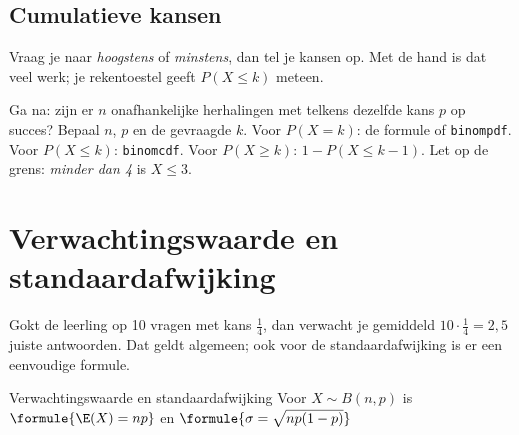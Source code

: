 \subsection{Cumulatieve kansen}

Vraag je naar \textit{hoogstens} of \textit{minstens}, dan tel je kansen op. Met de hand is dat veel werk; je rekentoestel geeft $P(X \leqslant k)$ meteen.


\begin{werkwijze}
Ga na: zijn er $n$ onafhankelijke herhalingen met telkens dezelfde kans $p$ op succes? Bepaal $n$, $p$ en de gevraagde $k$. Voor $P(X = k)$: de formule of \texttt{binompdf}. Voor $P(X \leqslant k)$: \texttt{binomcdf}. Voor $P(X \geqslant k)$: $1 - P(X \leqslant k - 1)$. Let op de grens: \textit{minder dan 4} is $X \leqslant 3$.
\end{werkwijze}


\begin{oefeningen}

\end{oefeningen}

\section{Verwachtingswaarde en standaardafwijking}

Gokt de leerling op 10 vragen met kans $\frac14$, dan verwacht je gemiddeld $10 \cdot \frac14 = 2{,}5$ juiste antwoorden. Dat geldt algemeen; ook voor de standaardafwijking is er een eenvoudige formule.

\begin{theorie}
\begin{stelling}{Verwachtingswaarde en standaardafwijking}
Voor $X \sim B(n, p)$ is \quad $\formule{\E(X) = np}$ \quad en \quad $\formule{\sigma = \sqrt{np(1 - p)}}$
\end{stelling}
\end{theorie}

